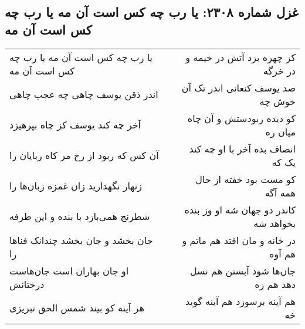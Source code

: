 \begin{center}
\section*{غزل شماره ۲۳۰۸: یا رب چه کس است آن مه یا رب چه کس است آن مه}
\label{sec:2308}
\begin{longtable}{l p{0.5cm} r}
یا رب چه کس است آن مه یا رب چه کس است آن مه
&&
کز چهره بزد آتش در خیمه و در خرگه
\\
اندر ذقن یوسف چاهی چه عجب چاهی
&&
صد یوسف کنعانی اندر تک آن خوش چه
\\
آخر چه کند یوسف کز چاه بپرهیزد
&&
کو دیده ربودستش و آن چاه میان ره
\\
آن کس که ربود از رخ مر کاه ربایان را
&&
انصاف بده آخر با او چه کند یک که
\\
زنهار نگهدارید زان غمزه زبان‌ها را
&&
کو مست بود خفته از حال همه آگه
\\
شطرنج همی‌بازد با بنده و این طرفه
&&
کاندر دو جهان شه او وز بنده بخواهد شه
\\
جان بخشد و جان بخشد چندانک فناها را
&&
در خانه و مان افتد هم ماتم و هم آوه
\\
او جان بهاران است جان‌هاست درختانش
&&
جان‌ها شود آبستن هم نسل دهد هم زه
\\
هر آینه کو بیند شمس الحق تبریزی
&&
هم آینه برسوزد هم آینه گوید خه
\\
\end{longtable}
\end{center}
